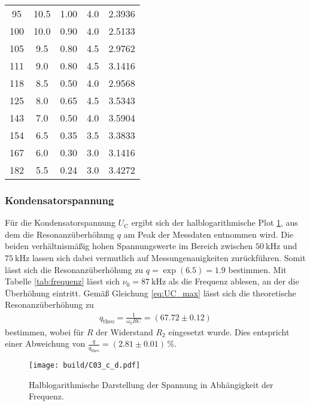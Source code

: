 \begin{table}[H]
\begin{tabular}{S[table-format = 3.0] S[table-format= 2.1] S[table-format = 1.2] S[table-format = 1.1] S[table-format = 1.4]}
         95 & 10.5 & 1.00 & 4.0 & 2.3936 \\
        100 & 10.0 & 0.90 & 4.0 & 2.5133 \\
        105 &  9.5 & 0.80 & 4.5 & 2.9762 \\
        111 &  9.0 & 0.80 & 4.5 & 3.1416 \\
        118 &  8.5 & 0.50 & 4.0 & 2.9568 \\
        125 &  8.0 & 0.65 & 4.5 & 3.5343 \\
        143 &  7.0 & 0.50 & 4.0 & 3.5904 \\
        154 &  6.5 & 0.35 & 3.5 & 3.3833 \\
        167 &  6.0 & 0.30 & 3.0 & 3.1416 \\
        182 &  5.5 & 0.24 & 3.0 & 3.4272 \\
        \bottomrule
    \end{tabular}
\end{table}
\noindent


\subsubsection{Kondensatorspannung}
Für die Kondensatorspannung $U_\text{C}$ ergibt sich der halblogarithmische Plot \ref{fig:plot_spannung}, aus dem die 
Resonanzüberhöhung $q$ am Peak der Messdaten entnommen wird.
Die beiden verhältnismäßig hohen Spannungswerte im Bereich zwischen $\qty{50}{\kilo\hertz}$ und $\qty{75}{\kilo\hertz}$
lassen sich dabei vermutlich auf Messungenauigkeiten zurückführen.
Somit lässt sich die Resonanzüberhöhung zu $q = \exp(6.5) = 1.9$ bestimmen. 
Mit Tabelle \ref{tab:frequenz} lässt sich $\nu_0 = \qty{87}{\kilo\hertz}$ als die Frequenz ablesen, an der die Überhöhung eintritt.
Gemäß Gleichung \eqref{eq:UC_max} lässt sich die theoretische Resonanzüberhöhung zu 
\begin{align}
    q_\text{theo} = \frac{1}{\omega_0 R C} = (\num{67.72} \pm \num{0.12})
\end{align}
bestimmen, wobei für $R$ der Widerstand $R_2$ eingesetzt wurde.
Dies entspricht einer Abweichung von $\frac{q}{q_\text{theo}} = (\num{2.81} \pm \num{0.01}) \, \%$.

%
\begin{figure}[H]
    \centering
    \texttt{[image: build/C03\_c\_d.pdf]}
    \caption{Halblogarithmische Darstellung der Spannung in Abhängigkeit der Frequenz.}
    \label{fig:plot_spannung}
\end{figure}


